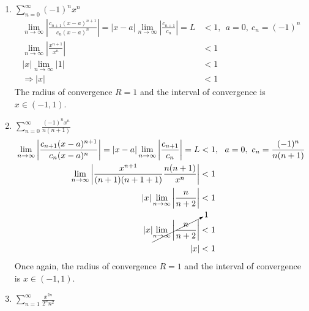 \begin{enumerate}
\item $\sum\limits_{n=0}^{\infty} (-1)^nx^n$
\begin{align*}
\lim_{n \to\infty} \left|\frac{c_{n+1}(x-a)^{n+1}}{c_n(x-a)^n} \right| = |x-a| \lim_{n \to\infty} \left|\frac{c_{n+1}}{c_n} \right| = L &< 1, \ \ a=0, \ c_n=(-1)^n \\
\lim_{n\to\infty}\left|\frac{x^{n+1}}{x^n}\right| &< 1 \\
\left| x \right| \lim_{n\to\infty} \left| 1 \right| &< 1 \\
\Rightarrow |x| &< 1
\end{align*}
The radius of convergence $R=1$ and the interval of convergence is $x\in(-1,1)$.  

\vspace{4.0cm}

\item $\sum\limits_{n=0}^{\infty} \frac{(-1)^n x^n}{n(n+1)}$
\begin{align*}
\lim_{n \to\infty} \left|\frac{c_{n+1}(x-a)^{n+1}}{c_n(x-a)^n} \right| = |x-a| \lim_{n \to\infty} \left|\frac{c_{n+1}}{c_n} \right| = L &< 1, \ \ a=0, \ c_n=\frac{(-1)^n}{n(n+1)} \\
\lim_{n \to \infty} \left|\frac{x^{n+1}}{(n+1)(n+1+1)}\frac{n(n+1)}{x^n}  \right|&<1 \\
|x| \lim_{n \to\infty}\left|\frac{n}{n+2} \right| &<1 \\
|x| \cancelto{1}{\lim_{n \to\infty}\left|\frac{n}{n+2} \right|}&<1 \\
|x| &< 1
\end{align*}
Once again, the radius of convergence $R=1$ and the interval of convergence is $x\in(-1,1)$.

\vspace{4.0cm}

\item $\sum\limits_{n=1}^{\infty} \frac{x^{2n}}{2^nn^2}$


\end{enumerate}
